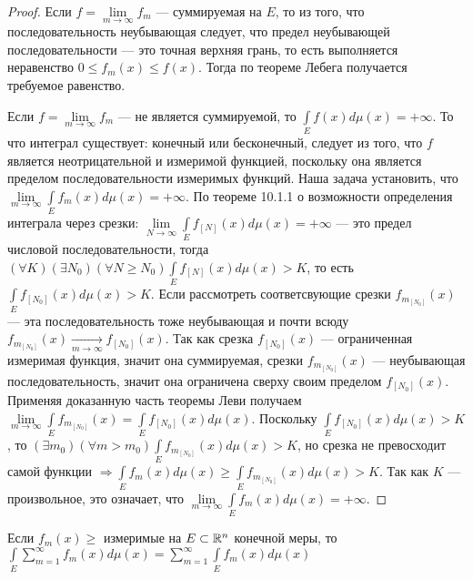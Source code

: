 \begin{proof}
	Если $f=\lim\limits_{m\to\infty}f_m$ --- суммируемая на $E$, то из того, что последовательность неубывающая следует, что предел неубывающей последовательности --- это точная верхняя грань, то есть выполняется неравенство $0\leqslant f_m(x)\leqslant f(x)$. Тогда по теореме Лебега получается требуемое равенство.
	
	Если $f=\lim\limits_{m\to\infty}f_m$ --- не является суммируемой, то $\int\limits_{E}f(x)d\mu(x)=+\infty$. То что интеграл существует: конечный или бесконечный, следует из того, что $f$ является неотрицательной и измеримой функцией, поскольку она является пределом последовательности измеримых функций. Наша задача установить, что $\lim\limits_{m\to\infty}\int\limits_{E}f_m(x)d\mu(x)=+\infty$. По теореме 10.1.1 о возможности определения интеграла через срезки: $\lim\limits_{N\to\infty}\int\limits_{E}f_{[N]}(x)d\mu(x)=+\infty$ --- это предел числовой последовательности, тогда $(\forall K)(\exists N_0)(\forall N\geqslant N_0)\int\limits_{E}f_{[N]}(x)d\mu(x)>K$, то есть $\int\limits_{E}f_{[N_0]}(x)d\mu(x)>K$. Если рассмотреть соответсвующие срезки $f_{m_{[N_0]}}(x)$ --- эта последовательность тоже неубывающая и почти всюду $f_{m_{[N_0]}}(x)\underset{m\to\infty}{\longrightarrow}f_{[N_0]}(x)$. Так как срезка $f_{[N_0]}(x)$ --- ограниченная измеримая функция, значит она суммируемая, срезки $f_{m_{[N_0]}}(x)$ --- неубывающая последовательность, значит она ограничена сверху своим пределом $f_{[N_0]}(x)$. Применяя доказанную часть теоремы Леви получаем $\lim\limits_{m\to\infty}\int\limits_{E}f_{m_{[N_0]}}(x)=\int\limits_{E}f_{[N_0]}(x)d\mu(x)$. Поскольку $\int\limits_{E}f_{[N_0]}(x)d\mu(x)>K$, то $(\exists m_0)(\forall m>m_0)\int\limits_{E}f_{m_{[N_0]}}(x)d\mu(x)>K$, но срезка не превосходит самой функции $\Rightarrow \int\limits_{E}f_m(x)d\mu(x)\geqslant\int\limits_{E}f_{m_{[N_0]}}(x)d\mu(x)>K$. Так как $K$ --- произвольное, это означает, что $\lim\limits_{m\to\infty}\int\limits_{E}f_m(x)d\mu(x)=+\infty$.
\end{proof}
\begin{corollary}
	Если $f_m(x)\geqslant$ измеримые на $E\subset\R^n$ конечной меры, то $\int\limits_{E}\sum\limits_{m=1}^\infty f_m(x)d\mu(x)=\sum\limits_{m=1}^\infty \int\limits_{E}f_m(x)d\mu(x)$
\end{corollary}

